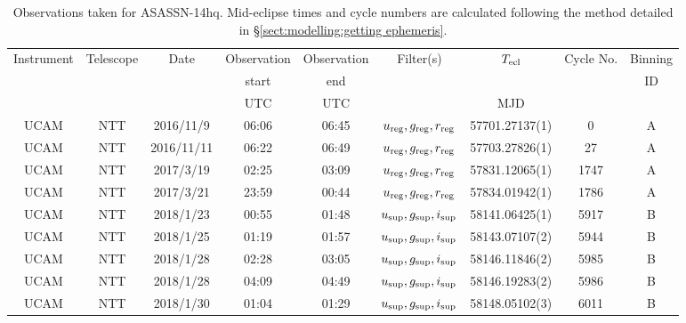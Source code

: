 \begin{table}
	\begin{center}
		\caption{Observations taken for ASASSN-14hq. Mid-eclipse times and cycle numbers are calculated following the method detailed in \S\ref{sect:modelling:getting ephemeris}.}
		\label{table:observing:observation logs ASASSN-14hq}
		\begin{tabular}{ccccccccc}
			\hline
			Instrument & Telescope & Date & Observation  & Observation  & Filter(s) & $T_{\rm ecl}$ & Cycle No. & Binning \\
			 &  &  &  start &  end &  &  &  & ID \\
			 &  &  & UTC & UTC &  & MJD &  &  \\
			\hline
			\hline
			 UCAM & NTT & 2016/11/9  & 06:06 & 06:45 & $u_{\rm reg},g_{\rm reg},r_{\rm reg}$ & 57701.27137(1) &    0 & A \\
			 UCAM & NTT & 2016/11/11 & 06:22 & 06:49 & $u_{\rm reg},g_{\rm reg},r_{\rm reg}$ & 57703.27826(1) &   27 & A \\
			 UCAM & NTT & 2017/3/19  & 02:25 & 03:09 & $u_{\rm reg},g_{\rm reg},r_{\rm reg}$ & 57831.12065(1) & 1747 & A \\
			 UCAM & NTT & 2017/3/21  & 23:59 & 00:44 & $u_{\rm reg},g_{\rm reg},r_{\rm reg}$ & 57834.01942(1) & 1786 & A \\
			 UCAM & NTT & 2018/1/23  & 00:55 & 01:48 & $u_{\rm sup},g_{\rm sup},i_{\rm sup}$ & 58141.06425(1) & 5917 & B \\
			 UCAM & NTT & 2018/1/25  & 01:19 & 01:57 & $u_{\rm sup},g_{\rm sup},i_{\rm sup}$ & 58143.07107(2) & 5944 & B \\
			 UCAM & NTT & 2018/1/28  & 02:28 & 03:05 & $u_{\rm sup},g_{\rm sup},i_{\rm sup}$ & 58146.11846(2) & 5985 & B \\
			 UCAM & NTT & 2018/1/28  & 04:09 & 04:49 & $u_{\rm sup},g_{\rm sup},i_{\rm sup}$ & 58146.19283(2) & 5986 & B \\
			 UCAM & NTT & 2018/1/30  & 01:04 & 01:29 & $u_{\rm sup},g_{\rm sup},i_{\rm sup}$ & 58148.05102(3) & 6011 & B \\
			\hline
			\end{tabular}
	\end{center}
\end{table}